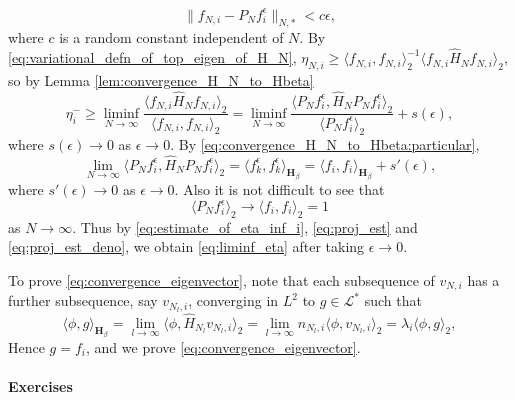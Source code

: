 \documentclass[11pt, a4paper]{article}
\numberwithin{equation}{section}
\newcommand{\Lstar}{\mathcal{L}^*}
\newcommand{\Hbeta}{\mathbf{H}_{\beta}}
\theoremstyle{definition}
\theoremstyle{remark}
\begin{document}
\begin{equation}
  \lVert f_{N, i} - P_N f^{\epsilon}_i \rVert_{N, *} < c\epsilon,
\end{equation}
where $c$ is a random constant independent of $N$. By \eqref{eq:variational_defn_of_top_eigen_of_H_N},  $\eta_{N, i} \geq \langle f_{N, i}, f_{N, i} \rangle^{-1}_2 \langle f_{N, i} \hat{H}_N f_{N, i} \rangle_2$, so by Lemma \ref{lem:convergence_H_N_to_Hbeta}
\begin{equation} \label{eq:estimate_of_eta_inf_i}
  \eta^-_i \geq \liminf_{N \to \infty} \frac{\langle f_{N, i} \hat{H}_N f_{N, i} \rangle_2}{\langle f_{N, i}, f_{N, i} \rangle_2} = \liminf_{N \to \infty} \frac{\langle P_N f^{\epsilon}_i, \hat{H}_N P_N f^{\epsilon}_i \rangle_2}{\langle P_N f^{\epsilon}_i \rangle_2} + s(\epsilon),
\end{equation}
where $s(\epsilon) \to 0$ as $\epsilon \to 0$. By \eqref{eq:convergence_H_N_to_Hbeta:particular},
\begin{equation} \label{eq:proj_est}
  \lim_{N \to \infty} \langle P_N f^{\epsilon}_i, \hat{H}_N P_N f^{\epsilon}_i \rangle_2 = \langle f^{\epsilon}_k, f^{\epsilon}_k \rangle_{\Hbeta} = \langle f_i, f_i \rangle_{\Hbeta} + s'(\epsilon),
\end{equation}
where $s'(\epsilon) \to 0$ as $\epsilon \to 0$. Also it is not difficult to see that
\begin{equation} \label{eq:proj_est_deno}
  \langle P_N f^{\epsilon}_i \rangle_2 \to \langle f_i, f_i \rangle_2 = 1
\end{equation}
as $N \to \infty$. Thus by \eqref{eq:estimate_of_eta_inf_i}, \eqref{eq:proj_est} and \eqref{eq:proj_est_deno}, we obtain \eqref{eq:liminf_eta} after taking $\epsilon \to 0$.

To prove \eqref{eq:convergence_eigenvector}, note that each subsequence of $v_{N, i}$ has a further subsequence, say $v_{N_l, i}$, converging in $L^2$ to $g \in \Lstar$ such that
\begin{equation}
  \langle \phi, g \rangle_{\Hbeta} = \lim_{l \to \infty} \langle \phi, \hat{H}_{N_l} v_{N_l, i} \rangle_2 = \lim_{l \to \infty} n_{N_l, i} \langle \phi, v_{N_l, i} \rangle_2 = \lambda_i \langle \phi, g \rangle_2,
\end{equation}
Hence $g = f_i$, and we prove \eqref{eq:convergence_eigenvector}.

\paragraph{Exercises}
\end{document}
